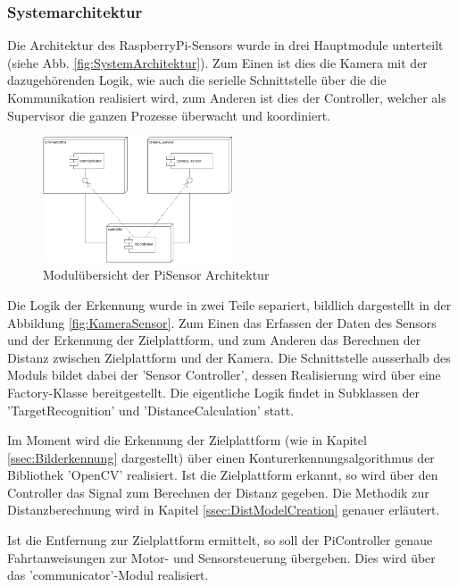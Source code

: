 \documentclass[a4paper]{report}
\begin{document}
\subsubsection{Systemarchitektur}
\label{ssec:SysArch}

Die Architektur des RaspberryPi-Sensors wurde in drei Hauptmodule unterteilt (siehe Abb. \ref{fig:SystemArchitektur}). Zum Einen ist dies die Kamera mit der dazugehörenden Logik, wie auch die serielle Schnittstelle über die die Kommunikation realisiert wird, zum Anderen ist dies der Controller, welcher als Supervisor die ganzen Prozesse überwacht und koordiniert.

\begin{figure}[h!]
	\centering
	\includegraphics[keepaspectratio,width=0.5\textwidth]{SystemArchitektur}
	\caption{Modulübersicht der PiSensor Architektur}
	\label{fig:PiSensorSystemArchitektur}
\end{figure}

Die Logik der Erkennung wurde in zwei Teile separiert, bildlich dargestellt in der Abbildung \ref{fig:KameraSensor}. Zum Einen das Erfassen der Daten des Sensors und der Erkennung der Zielplattform, und zum Anderen das Berechnen der Distanz zwischen Zielplattform und der Kamera. Die Schnittstelle ausserhalb des Moduls bildet dabei der 'Sensor Controller', dessen Realisierung wird über eine Factory-Klasse bereitgestellt. Die eigentliche Logik findet in Subklassen der 'TargetRecognition' und 'DistanceCalculation' statt.

Im Moment wird die Erkennung der Zielplattform (wie in Kapitel \ref{ssec:Bilderkennung} dargestellt) über einen Kontur\-erkennungs\-algorithmus der Bibliothek 'OpenCV' realisiert. Ist die Zielplattform erkannt, so wird über den Controller das Signal zum Berechnen der Distanz gegeben. Die Methodik zur Distanzberechnung wird in Kapitel \ref{ssec:DistModelCreation} genauer erläutert.

Ist die Entfernung zur Zielplattform ermittelt, so soll der PiController genaue Fahrtanweisungen zur Motor- und Sensorsteuerung übergeben. Dies wird über das 'communicator'-Modul realisiert.
\end{document}
